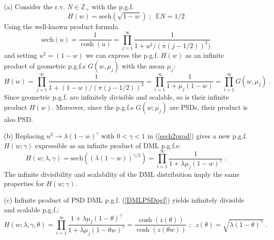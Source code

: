 \documentclass[a4paper,12pt]{amsart}
\newcommand{\E}{\mathbb{E}}
\newcommand{\Z}{\mathbb{Z}_{+}}
\theoremstyle{definition}
\theoremstyle{remark}
\begin{document}
\begin{enumerate}[label=(\roman*), leftmargin=*]
(a) Consider the r.v. $N\in \Z$ with the p.g.f. 
\begin{equation}\label{sechpgf}
H(w) = \text{sech}(\sqrt{1-w})\;;\;\; \E N =1/2
\end{equation}
Using the well-known product formula \cite{AbSteg1972}
\begin{equation}\label{sech2prod}
\text{sech}(u) = \frac{1}{\cosh(u)}=\prod_{j=1}^{\infty}\frac{1}{1+u^2/(\pi (j-1/2))^2)}
\end{equation} 
and setting $u^2=(1-w)$ we can express the p.g.f. $H(w)$ as an infinite product of geometric p.g.f.{}s $G(w,\mu_j)$ with the mean $\mu_j$:
\begin{equation}\label{infprodG}
H(w)= \prod_{j=1}^{\infty}\frac{1}{1+(1-w)/(\pi (j-1/2))^2} 
=\prod_{i=1}^{\infty}\frac{1}{1+\mu_j (1-w)}
=\prod_{i=1}^{\infty}G(w,\mu_j)
\;.
\end{equation} 
Since geometric p.g.f. are infinitely divisible and scalable, so is their infinite product $H(w)$. Moreover, since the p.g.f.{}s $G(w;\mu_j)$ are PSDs, their product is also PSD. 

(b) Replacing  $u^2 \to \lambda(1-w)^{\gamma}$ with $0<\gamma< 1$ in (\ref{sech2prod}) gives a new p.g.f. $H(w;\gamma)$ expressible as an infinite product of DML p.g.f.{}s:
\begin{equation}\label{infprod1}
H(w;\lambda,\gamma)= \text{sech}\left( (\lambda(1-w))^{\gamma /2}\right)
=\prod_{i=1}^{\infty}\frac{1}{1+\lambda\mu_j (1-w)^{\gamma}}\;.
\end{equation}
The infinite divisibility and scalability of the DML distribution imply the same properties for $H(w;\gamma)$. 

(c) Infinite product of PSD DML p.g.f. (\ref{DMLPSDpgf}) yields infinitely divisible and scalable p.g.f.:
\begin{equation}\label{infprod2}
H(w;\lambda,\gamma,\theta)= 
\prod_{i=1}^{\infty}\frac{1+\lambda\mu_j (1-\theta)^{\gamma}}{1+\lambda\mu_j (1-\theta w)^{\gamma}} =
\frac{\cosh (z(\theta))}{\cosh (z(\theta w))}\;;\;\; z(\theta)=\sqrt{\lambda  (1-\theta )^{\gamma}}\;.
\end{equation}


\end{enumerate}
\end{document}
